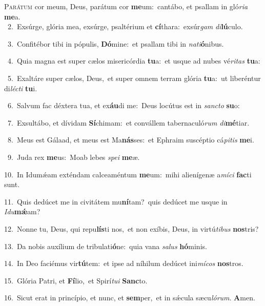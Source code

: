 \lettrine{\initial\textcolor{\initialcolor}{P}}{arátum} cor meum, Deus, parátum cor \textbf{me}\-um:~\star cantábo, et psallam in gló\-\textit{ri}\-\textit{a} \textbf{me}\-a.\\
{\numbfont\textcolor{\numbcolor}{~2.}}~Exsúrge, glória mea, exsúrge, psaltérium et \textbf{cí}\-thara:~\star exsúr\textit{gam} \textit{di}\-\textbf{lú}culo.\par
{\numbfont\textcolor{\numbcolor}{~3.}}~Confitébor tibi in pópulis, \textbf{Dó}\-mine:~\star et psallam tibi in \textit{na}\-\textit{ti}\textbf{ó}nibus.\par
{\numbfont\textcolor{\numbcolor}{~4.}}~Quia magna est super cælos misericórdia \textbf{tu}\-a:~\star et usque ad nubes vé\-\textit{ri}\-\textit{tas} \textbf{tu}\-a:\par
{\numbfont\textcolor{\numbcolor}{~5.}}~Exaltáre super cælos, Deus,~\dagger et super omnem terram glória \textbf{tu}\-a:~\star ut liberéntur di\-\textit{léc}\-\textit{ti} \textbf{tu}\-i.\par
{\numbfont\textcolor{\numbcolor}{~6.}}~Salvum fac déxtera tua, et ex\-\textbf{áu}\-di me:~\star Deus locútus est in \textit{sanc}\-\textit{to} \textbf{su}\-o:\par
{\numbfont\textcolor{\numbcolor}{~7.}}~Exsultábo, et dívidam \textbf{Sí}\-chimam:~\star et convállem tabernaculó\textit{rum} \textit{di}\-\textbf{mé}tiar.\par
{\numbfont\textcolor{\numbcolor}{~8.}}~Meus est Gálaad, et meus est Ma\-\textbf{nás}\-ses:~\star et Ephraim suscéptio cá\-\textit{pi}\-\textit{tis} \textbf{me}\-i.\par
{\numbfont\textcolor{\numbcolor}{~9.}}~Juda rex \textbf{me}\-us:~\star Moab lebes \textit{spe}\-\textit{i} \textbf{me}\-æ.\par
{\numbfont\textcolor{\numbcolor}{10.}}~In Idumǽam exténdam calceaméntum \textbf{me}\-um:~\star mihi alienígenæ a\-\textit{mí}\-\textit{ci} \textbf{fac}\-ti sunt.\par
{\numbfont\textcolor{\numbcolor}{11.}}~Quis dedúcet me in civitátem mu\-\textbf{ní}\-tam?~\star quis dedúcet me usque in \textit{I}\-\textit{du}\textbf{mǽ}am?\par
{\numbfont\textcolor{\numbcolor}{12.}}~Nonne tu, Deus, qui repu\-\textbf{lís}\-ti nos,~\star et non exíbis, Deus, in virtú\-\textit{ti}\-\textit{bus} \textbf{nos}\-tris?\par
{\numbfont\textcolor{\numbcolor}{13.}}~Da nobis auxílium de tribulati\-\textbf{ó}\-ne:~\star quia vana \textit{sa}\-\textit{lus} \textbf{hó}\-minis.\par
{\numbfont\textcolor{\numbcolor}{14.}}~In Deo faciémus vir\-\textbf{tú}\-tem:~\star et ipse ad níhilum dedúcet ini\-\textit{mí}\-\textit{cos} \textbf{nos}\-tros.\par
{\numbfont\textcolor{\numbcolor}{15.}}~Glória Patri, et \textbf{Fí}\-lio,~\star et Spirí\-\textit{tu}\-\textit{i} \textbf{Sanc}\-to.\par
{\numbfont\textcolor{\numbcolor}{16.}}~Sicut erat in princípio, et nunc, et \textbf{sem}\-per,~\star et in sǽcula sæcu\-\textit{ló}\-\textit{rum}. \textbf{A}\-men.\par
